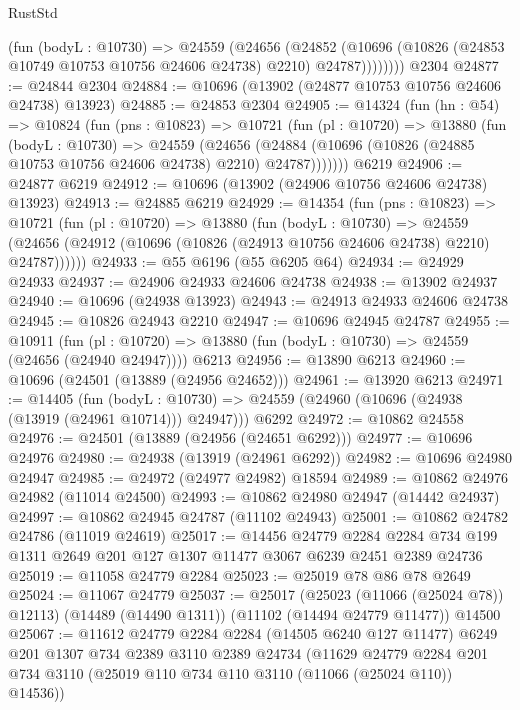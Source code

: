 \begin{lexlean}{RustStd}
\begin{coremodule}
            (fun (bodyL : @10730) =>
            @24559
              (@24656
                (@24852
                  (@10696 (@10826 (@24853 @10749 @10753 @10756 @24606 @24738) @2210) @24787))))))))
    @2304
@24877 := @24844 @2304
@24884 := @10696 (@13902 (@24877 @10753 @10756 @24606 @24738) @13923)
@24885 := @24853 @2304
@24905 := @14324
    (fun (hn : @54) =>
    @10824
      (fun (pns : @10823) =>
      @10721
        (fun (pl : @10720) =>
        @13880
          (fun (bodyL : @10730) =>
          @24559
            (@24656
              (@24884 (@10696 (@10826 (@24885 @10753 @10756 @24606 @24738) @2210) @24787)))))))
    @6219
@24906 := @24877 @6219
@24912 := @10696 (@13902 (@24906 @10756 @24606 @24738) @13923)
@24913 := @24885 @6219
@24929 := @14354
    (fun (pns : @10823) =>
    @10721
      (fun (pl : @10720) =>
      @13880
        (fun (bodyL : @10730) =>
        @24559 (@24656 (@24912 (@10696 (@10826 (@24913 @10756 @24606 @24738) @2210) @24787))))))
@24933 := @55 @6196 (@55 @6205 @64)
@24934 := @24929 @24933
@24937 := @24906 @24933 @24606 @24738
@24938 := @13902 @24937
@24940 := @10696 (@24938 @13923)
@24943 := @24913 @24933 @24606 @24738
@24945 := @10826 @24943 @2210
@24947 := @10696 @24945 @24787
@24955 := @10911
    (fun (pl : @10720) => @13880 (fun (bodyL : @10730) => @24559 (@24656 (@24940 @24947))))
    @6213
@24956 := @13890 @6213
@24960 := @10696 (@24501 (@13889 (@24956 @24652)))
@24961 := @13920 @6213
@24971 := @14405
    (fun (bodyL : @10730) => @24559 (@24960 (@10696 (@24938 (@13919 (@24961 @10714))) @24947)))
    @6292
@24972 := @10862 @24558
@24976 := @24501 (@13889 (@24956 (@24651 @6292)))
@24977 := @10696 @24976
@24980 := @24938 (@13919 (@24961 @6292))
@24982 := @10696 @24980 @24947
@24985 := @24972 (@24977 @24982) @18594
@24989 := @10862 @24976 @24982 (@11014 @24500)
@24993 := @10862 @24980 @24947 (@14442 @24937)
@24997 := @10862 @24945 @24787 (@11102 @24943)
@25001 := @10862 @24782 @24786 (@11019 @24619)
@25017 := @14456
    @24779
    @2284
    @2284
    @734
    @199
    @1311
    @2649
    @201
    @127
    @1307
    @11477
    @3067
    @6239
    @2451
    @2389
    @24736
@25019 := @11058 @24779 @2284
@25023 := @25019 @78 @86 @78 @2649
@25024 := @11067 @24779
@25037 := @25017
    (@25023 (@11066 (@25024 @78)) @12113)
    (@14489 (@14490 @1311))
    (@11102 (@14494 @24779 @11477))
    @14500
@25067 := @11612
    @24779
    @2284
    @2284
    (@14505 @6240 @127 @11477)
    @6249
    @201
    @1307
    @734
    @2389
    @3110
    @2389
    @24734
    (@11629
      @24779
      @2284
      @201
      @734
      @3110
      (@25019 @110 @734 @110 @3110 (@11066 (@25024 @110)) @14536))

\end{coremodule}
\end{lexlean}
